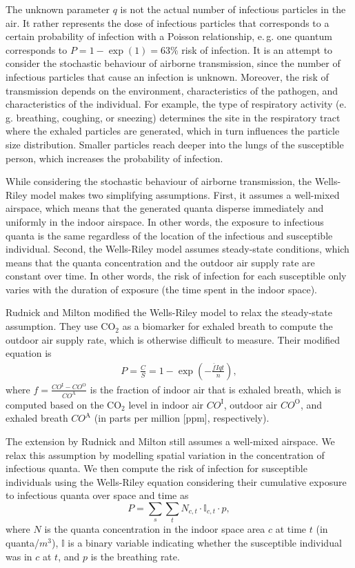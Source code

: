 \documentclass[fleqn,11pt]{wlscirep_supp}
\newcommand\eg{e.\,g.\xspace}
\begin{document}
The unknown parameter $q$ is not the actual number of infectious particles in the air. It rather represents the dose of infectious particles that corresponds to a certain probability of infection with a Poisson relationship, \eg one quantum corresponds to $P = 1 - \exp (1) = 63\%$ risk of infection\cite{Rudnick2003IndoorAir}. It is an attempt to consider the stochastic behaviour of airborne transmission, since the number of infectious particles that cause an infection is unknown. Moreover, the risk of transmission depends on the environment, characteristics of the pathogen, and characteristics of the individual. For example, the type of respiratory activity (\eg breathing, coughing, or sneezing) determines the site in the respiratory tract where the exhaled particles are generated, which in turn influences the particle size distribution\cite{Wei2016AMJIC}. Smaller particles reach deeper into the lungs of the susceptible person\cite{Wang2021Science}, which increases the probability of infection. 

While considering the stochastic behaviour of airborne transmission, the Wells-Riley model makes two simplifying assumptions. First, it assumes a well-mixed airspace, which means that the generated quanta disperse immediately and uniformly in the indoor airspace. In other words, the exposure to infectious quanta is the same regardless of the location of the infectious and susceptible individual. Second, the Wells-Riley model assumes steady-state conditions, which means that the quanta concentration and the outdoor air supply rate are constant over time. In other words, the risk of infection for each susceptible only varies with the duration of exposure (the time spent in the indoor space). 

Rudnick and Milton\cite{Rudnick2003IndoorAir} modified the Wells-Riley model to relax the steady-state assumption. They use CO$_2$ as a biomarker for exhaled breath to compute the outdoor air supply rate, which is otherwise difficult to measure. Their modified equation is
\begin{align}
    P = \frac{C}{S} = 1 - \exp \left(-\frac{\bar{f}Iqt}{n}\right),
\end{align}
where $f = \frac{CO^{\text{I}}-CO^{\text{O}}}{CO^{\text{A}}}$ is the fraction of indoor air that is exhaled breath, which is computed based on the CO$_2$ level in indoor air $CO^{\text{I}}$, outdoor air $CO^{\text{O}}$, and exhaled breath $CO^{\text{A}}$ (in parts per million [ppm], respectively). 

The extension by Rudnick and Milton still assumes a well-mixed airspace. We relax this assumption by modelling spatial variation in the concentration of infectious quanta. We then compute the risk of infection for susceptible individuals using the Wells-Riley equation considering their cumulative exposure to infectious quanta over space and time as 
\begin{equation}\label{eq:spattemp-P}
    P = \sum_s \sum_t N_{c,t} \cdot \mathbb{I}_{c,t} \cdot p,
\end{equation}
where $N$ is the quanta concentration in the indoor space area $c$ at time $t$ (in quanta/$m^3$), $\mathbb{I}$ is a binary variable indicating whether the susceptible individual was in $c$ at $t$, and $p$ is the breathing rate. 
\end{document}

